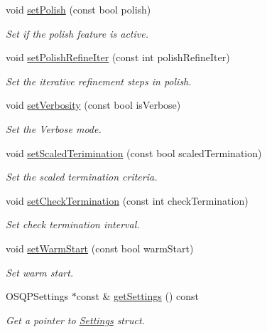 \begin{DoxyCompactItemize}
void \mbox{\hyperlink{classOsqpEigen_1_1Settings_a64c052c5f72065b5319e152095228859}{set\+Polish}} (const bool polish)
\begin{DoxyCompactList}\small\item\em Set if the polish feature is active. \end{DoxyCompactList}\item 
void \mbox{\hyperlink{classOsqpEigen_1_1Settings_aabae74571bfbb2b33ec23b255476fbec}{set\+Polish\+Refine\+Iter}} (const int polish\+Refine\+Iter)
\begin{DoxyCompactList}\small\item\em Set the iterative refinement steps in polish. \end{DoxyCompactList}\item 
void \mbox{\hyperlink{classOsqpEigen_1_1Settings_ac44115458417ef2257bc5c49634b0749}{set\+Verbosity}} (const bool is\+Verbose)
\begin{DoxyCompactList}\small\item\em Set the Verbose mode. \end{DoxyCompactList}\item 
void \mbox{\hyperlink{classOsqpEigen_1_1Settings_ab7d836e9f75480452c7e353e64608a31}{set\+Scaled\+Terimination}} (const bool scaled\+Termination)
\begin{DoxyCompactList}\small\item\em Set the scaled termination criteria. \end{DoxyCompactList}\item 
void \mbox{\hyperlink{classOsqpEigen_1_1Settings_aebc0ad14de70c7c68c09135929dd7a75}{set\+Check\+Termination}} (const int check\+Termination)
\begin{DoxyCompactList}\small\item\em Set check termination interval. \end{DoxyCompactList}\item 
void \mbox{\hyperlink{classOsqpEigen_1_1Settings_a5a9e4b887938fd742f81067563d021a6}{set\+Warm\+Start}} (const bool warm\+Start)
\begin{DoxyCompactList}\small\item\em Set warm start. \end{DoxyCompactList}\item 
O\+S\+Q\+P\+Settings $\ast$const  \& \mbox{\hyperlink{classOsqpEigen_1_1Settings_a306790b26968dde8dcd042fe48d2d924}{get\+Settings}} () const
\begin{DoxyCompactList}\small\item\em Get a pointer to \mbox{\hyperlink{classOsqpEigen_1_1Settings}{Settings}} struct. \end{DoxyCompactList}\end{DoxyCompactItemize}


